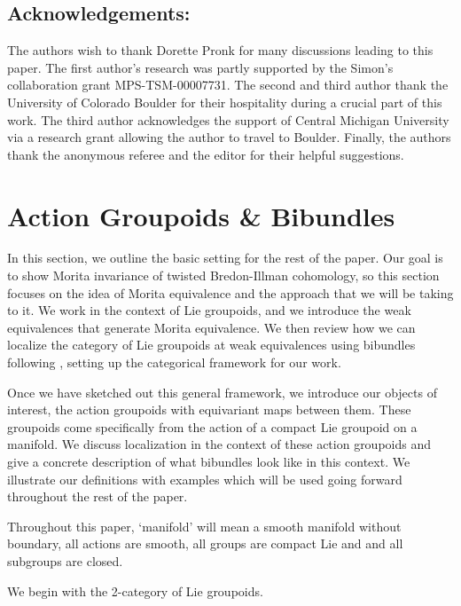 \documentclass[12pt,reqno]{amsart}
\newcommand{\printname}[1]{}
\renewcommand{\printname}[1]
	{{\color{brown}{\makebox[0pt]{\hspace{-1in}\raisebox{8pt}{\tiny #1}}}}}
\newcommand{\labell}[1]{\label{#1} \printname{#1}}
\theoremstyle{plain}
\theoremstyle{definition}
\begin{document}
\subsection*{Acknowledgements:}  The authors wish to thank Dorette Pronk for many discussions leading to this paper.  The first author's research was partly supported by the Simon's collaboration grant MPS-TSM-00007731.  The second and  third author thank the University of Colorado Boulder for their hospitality during a crucial part of this work.  The third author acknowledges the support of Central Michigan University via a research grant allowing the author to travel to Boulder.   Finally, the authors thank the anonymous referee and the editor for their helpful suggestions.




\section{Action Groupoids \& Bibundles}\labell{s:act gpds}

In this section, we outline the basic setting for the rest of the paper.  Our goal is to show Morita invariance of twisted Bredon-Illman cohomology, so this section focuses on the idea of Morita equivalence and the approach that we will be taking to it.  We work in the context of Lie groupoids, and we introduce the weak equivalences that generate Morita equivalence.  We then review how we can localize the category of Lie groupoids at weak equivalences using bibundles following \cite{lerman:orbifolds,MM:sheaves}, setting up the categorical framework for our work. 

Once we have sketched out this general framework, we introduce our objects of interest, the  action groupoids with equivariant maps between them.  These groupoids come specifically from the action of a compact Lie groupoid on a manifold.     We discuss localization in the context of  these action groupoids and give a concrete description of what bibundles look like in this context.    We illustrate our definitions with examples which will be used going forward throughout the rest of the paper.  

Throughout this paper, `manifold' will mean a smooth manifold without boundary, all actions are smooth, all groups are compact Lie and and all subgroups are closed. 

We begin with the 2-category of Lie groupoids.  
\end{document}
